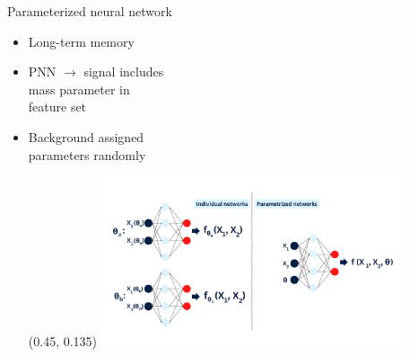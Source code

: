 \documentclass[UKenglish]{beamer}
\begin{document}
\begin{frame}{Parameterized neural network}
    \begin{itemize}
        \item Long-term memory
        \item PNN $\rightarrow$ signal includes\\ mass parameter in\\ feature set
        \item Background assigned\\
        parameters randomly\\
        \begin{textblock}{0.8}(0.45, 0.135)
            \includegraphics[width = 0.7\textwidth]{figures/PNN.png}
        \end{textblock}
    \end{itemize}
\end{frame}
\end{document}
